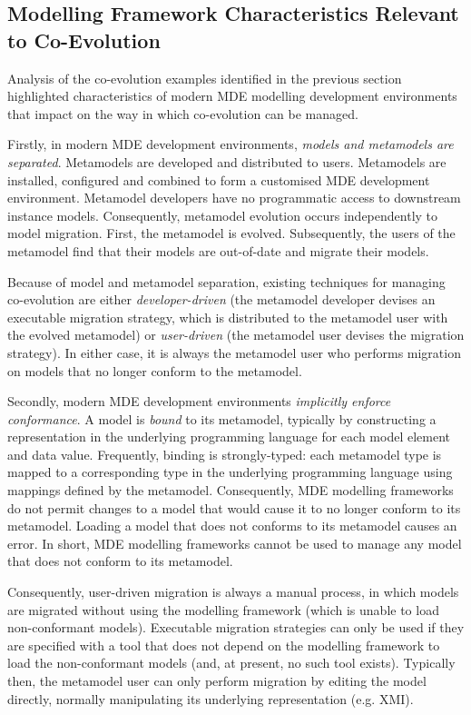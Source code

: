 \subsection{Modelling Framework Characteristics Relevant to Co-Evolution}
\label{subsec:modelling_framework_characteristics}
Analysis of the co-evolution examples identified in the previous section highlighted characteristics of modern MDE modelling development environments that impact on the way in which co-evolution can be managed.

Firstly, in modern MDE development environments, \emph{models and metamodels are separated}. Metamodels are developed and distributed to users. Metamodels are installed, configured and combined to form a customised MDE development environment. Metamodel developers have no programmatic access to downstream instance models. Consequently, metamodel evolution occurs independently to model migration. First, the metamodel is evolved. Subsequently, the users of the metamodel find that their models are out-of-date and migrate their models.

Because of model and metamodel separation, existing techniques for managing co-evolution are either \emph{developer-driven} (the metamodel developer devises an executable migration strategy, which is distributed to the metamodel user with the evolved metamodel) or \emph{user-driven} (the metamodel user devises the migration strategy). In either case, it is always the metamodel user who performs migration on models that no longer conform to the metamodel.

Secondly, modern MDE development environments \emph{implicitly enforce conformance}. A model is \emph{bound} to its metamodel, typically by constructing a representation in the underlying programming language for each model element and data value. Frequently, binding is strongly-typed: each metamodel type is mapped to a corresponding type in the underlying programming language using mappings defined by the metamodel. Consequently, MDE modelling frameworks do not permit changes to a model that would cause it to no longer conform to its metamodel. Loading a model that does not conforms to its metamodel causes an error. In short, MDE modelling frameworks cannot be used to manage any model that does not conform to its metamodel.

Consequently, user-driven migration is always a manual process, in which models are migrated without using the modelling framework (which is unable to load non-conformant models). Executable migration strategies can only be used if they are specified with a tool that does not depend on the modelling framework to load the non-conformant models (and, at present, no such tool exists). Typically then, the metamodel user can only perform migration by editing the model directly, normally manipulating its underlying representation (e.g. XMI).

